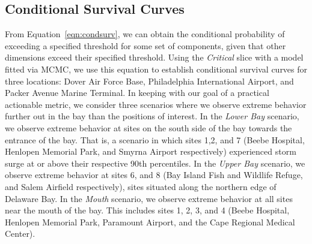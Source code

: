\subsection{Conditional Survival Curves}
From Equation~\ref{eqn:condsurv}, we can obtain the conditional probability of
    exceeding a specified threshold for some set of components, given that other 
    dimensions exceed their specified threshold. Using the \emph{Critical} slice with 
    a model fitted via MCMC, we use this equation to establish conditional survival 
    curves for three locations: Dover Air Force Base, Philadelphia International 
    Airport, and Packer Avenue Marine Terminal.  In keeping with our goal of a 
    practical actionable metric, we consider three scenarios where we observe extreme 
    behavior further out in the bay than the positions of interest.  In the 
    \emph{Lower Bay} scenario, we observe extreme behavior at sites on the south 
    side of the bay towards the entrance of the bay.  That is, a scenario in which 
    sites 1,2, and 7 (Beebe Hospital, Henlopen Memorial Park, and Smyrna Airport 
    respectively) experienced storm surge at or above their respective 90th 
    percentiles.  In the \emph{Upper Bay} scenario, we observe extreme behavior 
    at sites 6, and 8 (Bay Island Fish and Wildlife Refuge, and Salem Airfield 
    respectively), sites situated along the northern edge of Delaware Bay.  In 
    the \emph{Mouth} scenario, we observe extreme behavior at all sites near the 
    mouth of the bay.  This includes sites 1, 2, 3, and 4 (Beebe Hospital, Henlopen Memorial Park, 
    Paramount Airport, and the Cape Regional Medical Center). 

